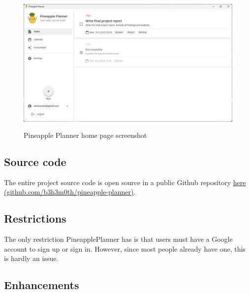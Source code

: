 \documentclass{article}
\begin{document}
\begin{figure}[H]
  \centering
  \includegraphics[width=1\textwidth]{images/pineapple_planner_screenshot_home.png}
  \label{Infrastructure proposal}
  \caption{Pineapple Planner home page screenshot}
\end{figure}

\subsection{Source code}
The entire project source code is open source in a public Github repository \href{http://www.github.com/b3h3m0th/pineapple-planner}{here (github.com/b3h3m0th/pineapple-planner)}.

\subsection{Restrictions}
The only restriction PineapplePlanner has is that users must have a Google account to sign up or sign in. However, since most people already have one, this is hardly an issue.
\subsection{Enhancements}
\end{document}
